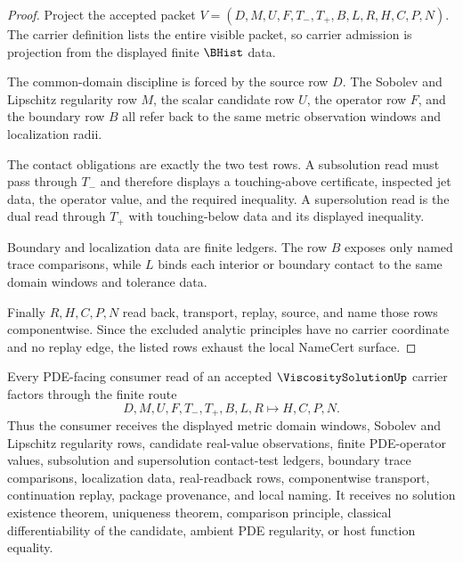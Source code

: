 \begin{proof}
Project the accepted packet $V=(D,M,U,F,T_{-},T_{+},B,L,R,H,C,P,N)$. The carrier definition lists the entire visible packet, so carrier admission is projection from the displayed finite $\BHist$ data.

The common-domain discipline is forced by the source row $D$. The Sobolev and Lipschitz regularity row $M$, the scalar candidate row $U$, the operator row $F$, and the boundary row $B$ all refer back to the same metric observation windows and localization radii.

The contact obligations are exactly the two test rows. A subsolution read must pass through $T_{-}$ and therefore displays a touching-above certificate, inspected jet data, the operator value, and the required inequality. A supersolution read is the dual read through $T_{+}$ with touching-below data and its displayed inequality.

Boundary and localization data are finite ledgers. The row $B$ exposes only named trace comparisons, while $L$ binds each interior or boundary contact to the same domain windows and tolerance data.

Finally $R,H,C,P,N$ read back, transport, replay, source, and name those rows componentwise. Since the excluded analytic principles have no carrier coordinate and no replay edge, the listed rows exhaust the local NameCert surface.
\end{proof}

\begin{theorem}
\label{thm:viscosity-solution-test-function-boundary}
Every PDE-facing consumer read of an accepted $\ViscositySolutionUp$ carrier factors through the finite route
$$
D,M,U,F,T_{-},T_{+},B,L,R \longmapsto H,C,P,N .
$$
Thus the consumer receives the displayed metric domain windows, Sobolev and Lipschitz regularity rows, candidate real-value observations, finite PDE-operator values, subsolution and supersolution contact-test ledgers, boundary trace comparisons, localization data, real-readback rows, componentwise transport, continuation replay, package provenance, and local naming. It receives no solution existence theorem, uniqueness theorem, comparison principle, classical differentiability of the candidate, ambient PDE regularity, or host function equality.
\end{theorem}

